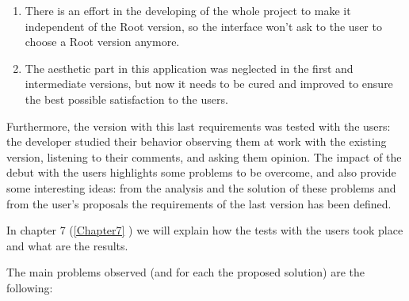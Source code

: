 \begin{enumerate}
\item
There is an effort in the developing of the whole project to make it independent of the Root version, so the interface won't ask to the user to choose a Root version anymore. 

\item
The aesthetic part in this application was neglected in the first and intermediate versions, but now it needs to be cured and improved to ensure the best possible satisfaction to the users. 

\end{enumerate}
 
Furthermore, the version with this last requirements was tested with the users: the developer studied their behavior observing them at work with the existing version, listening to their comments, and asking them opinion. The impact of the debut with the users highlights some problems to be overcome, and also provide some interesting ideas: from the analysis and the solution of these problems and from the user's proposals the requirements of the last version has been defined. 

In chapter 7 (\ref{Chapter7} ) we will explain how the tests with the users took place and what are the results.

The main problems observed (and for each the proposed solution) are the following:

